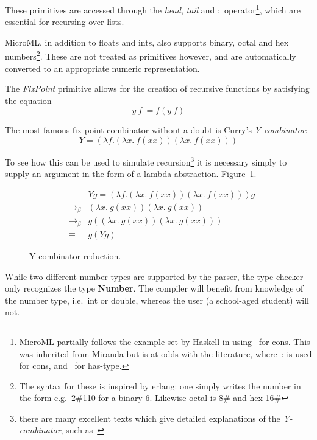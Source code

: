 \documentclass[12pt, a4paper]{report}
\begin{document}
These primitives are accessed through the \textit{head}, \textit{tail} and \textbf{$:$}
operator\footnote{MicroML partially follows the example set by Haskell in using~\: for cons. This
was inherited from Miranda but is at odds with the literature, where~\:: is used for cons, and~\: for
has-type.}, which are essential for recursing over lists.

MicroML, in addition to floats and ints, also supports binary, octal and hex numbers\footnote{The
syntax for these is inspired by erlang: one simply writes the number in the form e.g.\ 2\#110 for a
binary 6. Likewise octal is 8\# and hex 16\#}. These are not treated as primitives however, and are
automatically converted to an appropriate numeric representation.

The \textit{FixPoint} primitive allows for the creation of recursive functions by satisfying the equation
\begin{displaymath}
    y\ f\ = f (y\ f)
\end{displaymath}

The most famous fix-point combinator without a doubt is Curry's \textit{Y-combinator}:
\begin{displaymath}
    Y = (\lambda f. (\lambda x.\ f (x x)) (\lambda x.\ f (x x)))
\end{displaymath}

To see how this can be used to simulate recursion\footnote{there are many excellent texts which
give detailed explanations of the \textit{Y-combinator}, such as~\cite{citeulike:4001400}} it is necessary simply
to supply an argument in the form of a lambda abstraction. Figure~\ref{fig:yCombinator}.

\begin{figure}
        \begin{eqnarray*}
            && Y g = (\lambda f. (\lambda x.\ f (x x)) (\lambda x.\ f (x x))) g \\
            & \to_\beta & (\lambda x.\ g (x x)) (\lambda x.\ g (x x)) \\
            & \to_\beta & g ((\lambda x.\ g (x x)) (\lambda x.\ g (x x))) \\
            & \equiv & g (Y g)
        \end{eqnarray*}
    \caption{Y combinator reduction.}
    \label{fig:yCombinator}
\end{figure}

While two different number types are supported by the parser, the type checker only recognizes the
type \textbf{Number}. The compiler will benefit from knowledge of the number type, i.e.\ int or double,
whereas the user (a school-aged student) will not.
\end{document}
